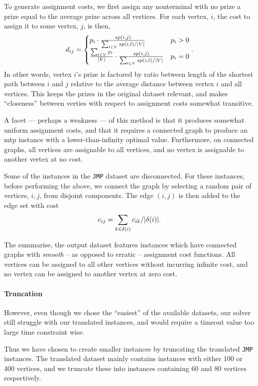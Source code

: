  To generate assignment costs, we first assign any nonterminal with no prize a prize
 equal to the average prize across all vertices. For each vertex, $i$, the cost to assign
 it to some vertex, $j$, is then,
 $$d_{ij} =
 \begin{cases}
   p_i \cdot \frac{sp(i, j)}{\sum_{l \in V}sp(i,l) / |V|} & p_i > 0 \\
      \frac{\sum_{l \in V} p_l}{|V|} \cdot \frac{sp(i, j)}{\sum_{l \in V}sp(i,l) / |V|} & p_i = 0
 \end{cases}\mathnormal{.}
$$
 In other words, vertex $i$'s prize is factored by ratio between length of the shortest path
 between $i$ and $j$ relative to the average distance between vertex $i$ and all vertices.
 This keeps the prizes in the original dataset relevant, and makes ``closeness'' between
 verties with respect to assignment costs somewhat transitive.

 A facet --- perhaps a weakness --- of this method is that it produces somewhat uniform
 assignment costs, and that it requires a connected graph to produce an \gls{mtp} instance
 with a lower-than-infinity optimal value. Furthermore, on connected graphs, all vertices
 are assignable to all vertices, and no vertex is assignable to another vertex at no cost.

 Some of the instances in the \texttt{JMP} dataset are disconnected. For these instances,
 before performing the above, we connect the graph by selecting a random pair of vertices,
 $i,j$, from disjoint components. The edge $(i,j)$ is then added to the edge set with cost
 $$c_{ij} = \sum_{k \in \delta(i)} c_{ik} / |\delta(i)|\mathnormal{.}$$

 The summarise, the output dataset features instances which have connected graphs with
 \textit{smooth} -- as opposed to erratic -- assignment cost functions. All vertices
 can be assigned to all other vertices without incurring infinite cost, and no vertex
 can be assigned to another vertex at zero cost. 

 \paragraph{Truncation} However, even though we chose the ``easiest'' of the available datasets,
 our solver still struggle with our translated instances, and would require a timeout
 value too large time constraint wise.

 Thus we have chosen to create smaller instances by truncating the translated \texttt{JMP}
 instances. The translated dataset mainly contains instances with either $100$ or $400$ vertices,
 and we truncate these into instances containing $60$ and $80$ vertices respectively.

